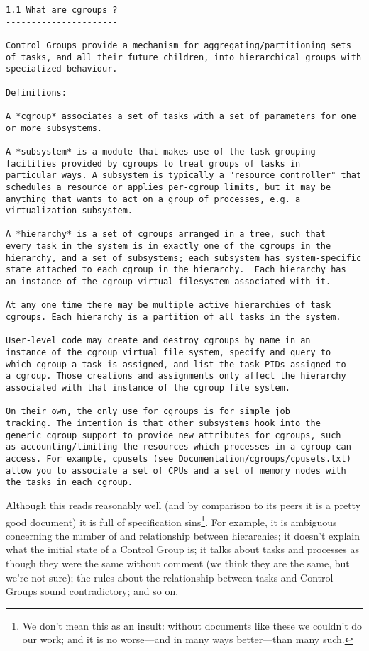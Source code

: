 \documentclass[a4paper,twoside,12pt]{article}
\begin{document}
{\small \begin{verbatim}
1.1 What are cgroups ?
----------------------

Control Groups provide a mechanism for aggregating/partitioning sets
of tasks, and all their future children, into hierarchical groups with
specialized behaviour.

Definitions:

A *cgroup* associates a set of tasks with a set of parameters for one
or more subsystems.

A *subsystem* is a module that makes use of the task grouping
facilities provided by cgroups to treat groups of tasks in
particular ways. A subsystem is typically a "resource controller" that
schedules a resource or applies per-cgroup limits, but it may be
anything that wants to act on a group of processes, e.g. a
virtualization subsystem.

A *hierarchy* is a set of cgroups arranged in a tree, such that
every task in the system is in exactly one of the cgroups in the
hierarchy, and a set of subsystems; each subsystem has system-specific
state attached to each cgroup in the hierarchy.  Each hierarchy has
an instance of the cgroup virtual filesystem associated with it.

At any one time there may be multiple active hierarchies of task
cgroups. Each hierarchy is a partition of all tasks in the system.

User-level code may create and destroy cgroups by name in an
instance of the cgroup virtual file system, specify and query to
which cgroup a task is assigned, and list the task PIDs assigned to
a cgroup. Those creations and assignments only affect the hierarchy
associated with that instance of the cgroup file system.

On their own, the only use for cgroups is for simple job
tracking. The intention is that other subsystems hook into the
generic cgroup support to provide new attributes for cgroups, such
as accounting/limiting the resources which processes in a cgroup can
access. For example, cpusets (see Documentation/cgroups/cpusets.txt)
allow you to associate a set of CPUs and a set of memory nodes with
the tasks in each cgroup.
\end{verbatim}}
Although this reads reasonably well (and by comparison to its peers it is a pretty good document) it is
full of specification sins\footnote{We don't mean this as an insult: without documents like these we couldn't do our work; and it is no worse---and in many ways better---than many such.}. For example, it is ambiguous concerning the number of and relationship between hierarchies; it
doesn't explain what the initial state of a Control Group is; it talks about tasks and processes as though they were the same without comment (we think they are the same, but we're not sure); the rules about the relationship between tasks and Control Groups sound contradictory; and so on.
\end{document}
